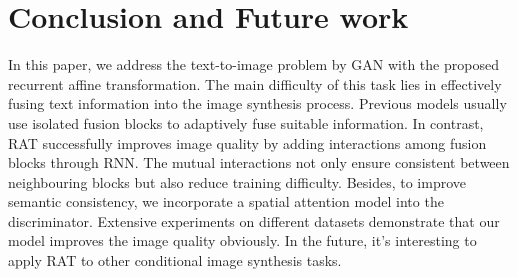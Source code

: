 \documentclass{article}
\begin{document}
	\section{Conclusion and Future work}
	In this paper, 	we address the text-to-image problem by GAN with the proposed recurrent affine transformation.  The main difficulty of this task lies in effectively fusing text information into the image synthesis process. Previous models usually use isolated fusion blocks to adaptively fuse suitable information. In contrast,	RAT successfully improves image quality by adding interactions among fusion blocks through RNN. The mutual interactions not only ensure consistent between neighbouring blocks but also
reduce training difficulty.
	Besides, to improve semantic consistency, we incorporate a spatial attention model into the discriminator. Extensive experiments on different datasets demonstrate that our model improves the image quality obviously. In the future, it's interesting to apply RAT to other conditional image synthesis tasks.
	
	
\end{document}
